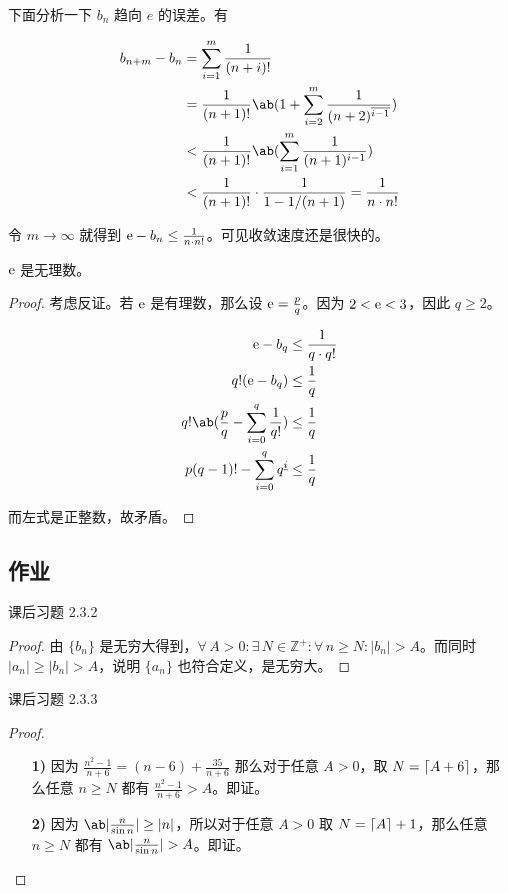 下面分析一下 $b_n$ 趋向 $e$ 的误差。有

$$
\begin{aligned}
	b_{n+m} - b_n & = \sum_{i=1}^m \frac{1}{(n+i)!} \\
	& = \frac{1}{(n+1)!} \ab(1 + \sum_{i=2}^m \frac{1}{(n+2)^{\overline{i-1}}}) \\
	& < \frac{1}{(n+1)!} \ab(\sum_{i=1}^m \frac{1}{(n+1)^{i-1}}) \\
	& < \frac{1}{(n+1)!} \cdot \frac{1}{1 - 1/(n+1)} = \frac{1}{n \cdot n!} \\
\end{aligned}
$$

令 $m \to \infty$ 就得到 $\mathrm{e} - b_n \le \frac{1}{n \cdot n!}$。可见收敛速度还是很快的。

\begin{theorem}
	$\mathrm{e}$ 是无理数。

	\begin{proof}
		考虑反证。若 $\mathrm{e}$ 是有理数，那么设 $\mathrm{e} = \frac{p}{q}$。因为 $2 < \mathrm{e} < 3$，因此 $q \ge 2$。

		$$
		\begin{aligned}
			\E - b_q & \le \frac{1}{q \cdot q!} \\
			q!(\E - b_q) & \le \frac{1}{q} \\
			q!\ab(\frac{p}{q} - \sum_{i=0}^q \frac{1}{q!}) & \le \frac{1}{q} \\
			p(q-1)! - \sum_{i=0}^q q^{\underline{i}} & \le \frac{1}{q}
		\end{aligned}
		$$

		而左式是正整数，故矛盾。
	\end{proof}
\end{theorem}

\subsection{作业}

\begin{problem}
	课后习题 2.3.2

	\begin{proof}
		由 $\{b_n\}$ 是无穷大得到，$\forall\,A > 0: \exists\,N \in \mathbb{Z}^+: \forall\,n \ge N: |b_n| > A$。而同时 $|a_n| \ge |b_n| > A$，说明 $\{a_n\}$ 也符合定义，是无穷大。
	\end{proof}
\end{problem}

\begin{problem}
	课后习题 2.3.3

	\begin{proof}
		\begin{enumerate}
			\item[\textbf{1)}] 因为 $\frac{n^2 - 1}{n + 6} = (n - 6) + \frac{35}{n + 6}$ 那么对于任意 $A > 0$，取 $N = \lceil A + 6\rceil$，那么任意 $n \ge N$ 都有 $\frac{n^2 - 1}{n + 6} > A$。即证。

			\item[\textbf{2)}] 因为 $\ab|\frac{n}{\sin n}| \ge |n|$，所以对于任意 $A > 0$ 取 $N = \lceil A\rceil + 1$，那么任意 $n \ge N$ 都有 $\ab|\frac{n}{\sin n}| > A$。即证。
		\end{enumerate}
	\end{proof}
\end{problem}


